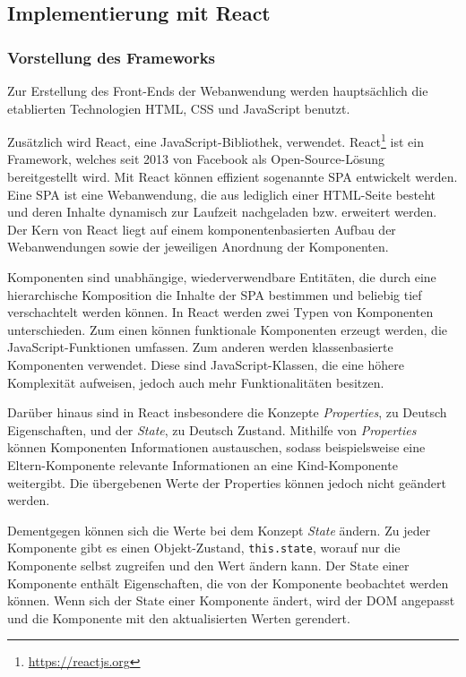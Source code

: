 \subsection{Implementierung mit React}
\subsubsection{Vorstellung des Frameworks}
Zur Erstellung des Front-Ends der Webanwendung werden hauptsächlich die etablierten Technologien \ac{HTML}, \ac{CSS} und JavaScript benutzt.

Zusätzlich wird React, eine JavaScript-Bibliothek, verwendet.
React\footnote{\url{https://reactjs.org}} ist ein Framework, welches seit 2013 von Facebook als Open-Source-Lösung bereitgestellt wird.\autocite[Vgl.][S. 3]{React2019} 
Mit React können effizient sogenannte \ac{SPA} entwickelt werden. 
Eine \ac{SPA} ist eine Webanwendung, die aus lediglich einer \ac{HTML}-Seite besteht und deren Inhalte dynamisch zur Laufzeit nachgeladen bzw. erweitert werden.
Der Kern von React liegt auf einem komponentenbasierten Aufbau der Webanwendungen sowie der jeweiligen Anordnung der Komponenten.\autocite[Vgl.][S. 3]{React2019} 

Komponenten sind unabhängige, wiederverwendbare Entitäten, die durch eine hierarchische Komposition die Inhalte der \ac{SPA} bestimmen und beliebig tief verschachtelt werden können.
In React werden zwei Typen von Komponenten unterschieden. 
Zum einen können funktionale Komponenten erzeugt werden, die JavaScript-Funktionen umfassen. 
Zum anderen werden klassenbasierte Komponenten verwendet. 
Diese sind JavaScript-Klassen, die eine höhere Komplexität aufweisen, jedoch auch mehr Funktionalitäten besitzen. 

Darüber hinaus sind in React insbesondere die Konzepte \textit{Properties}, zu Deutsch Eigenschaften, und der \textit{State}, zu Deutsch Zustand. 
Mithilfe von \textit{Properties} können Komponenten Informationen austauschen, sodass beispielsweise eine Eltern-Komponente relevante Informationen an eine Kind-Komponente weitergibt. 
Die übergebenen Werte der Properties können jedoch nicht geändert werden. 

Dementgegen können sich die Werte bei dem Konzept \textit{State} ändern. 
Zu jeder Komponente gibt es einen Objekt-Zustand, \texttt{this.state}, worauf nur die Komponente selbst zugreifen und den Wert ändern kann. 
Der State einer Komponente enthält Eigenschaften, die von der Komponente beobachtet werden können. 
Wenn sich der State einer Komponente ändert, wird der \ac{DOM} angepasst und die Komponente mit den aktualisierten Werten gerendert. 

